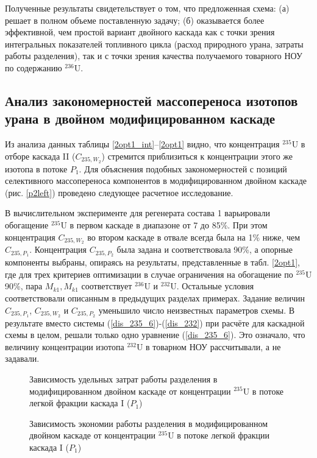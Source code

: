 {Полученные результаты свидетельствует о том, что предложенная схема: (а) решает в полном объеме поставленную задачу; (б) оказывается более эффективной, чем простой вариант двойного каскада как с точки зрения интегральных показателей топливного цикла (расход природного урана, затраты работы разделения), так и с точки зрения качества получаемого товарного НОУ по содержанию $^{236}$U.

\subsection{Анализ закономерностей массопереноса изотопов урана в двойном модифицированном каскаде}


Из анализа данных таблицы \ref{2opt1_int}--\ref{2opt1} видно, что концентрация $^{235}$U в отборе каскада II ($C_{235,{W_2}}$) стремится приблизиться к концентрации этого же изотопа в потоке $P_1$. Для объяснения подобных закономерностей с позиций селективного массопереноса компонентов в модифицированном двойном каскаде (рис. \ref{p2left}) проведено следующее расчетное исследование.

В вычислительном эксперименте для регенерата состава 1 варьировали обогащение $^{235}$U в первом каскаде в диапазоне от 7 до 85\%. При этом концентрация $C_{235,{W_2}}$ во втором каскаде в отвале всегда была на 1\% ниже, чем $C_{235,{P_1}}$. Концентрация  $C_{235,{P_2}}$ была задана и соответствовала 90\%, а опорные компоненты выбраны, опираясь на результаты, представленные в табл. \ref{2opt1}, где для трех критериев оптимизации в случае ограничения на обогащение по $^{235}$U 90\%, пара $M_{k1}, M_{k1}$ соответствует $^{236}$U и $^{232}$U.  Остальные условия соответствовали описанным в предыдущих разделах примерах.  
Задание величин $C_{235,{P_1}}$, $C_{235,{W_2}}$ и $C_{235,{P_2}}$ уменьшило число неизвестных параметров схемы. В результате вместо системы (\ref{dis_235_6})-(\ref{dis_232}) при расчёте для каскадной схемы в целом, решали только одно уравнение (\ref{dis_235_6}). Это означало, что величину концентрации изотопа $^{232}$U в товарном НОУ рассчитывали, а не задавали.    


\begin{figure}[ht]
    \centering
    \begin{minipage}{.5\textwidth}
        \centering
        
  \caption{{Зависимость удельных затрат работы разделения в модифицированном двойном каскаде  от концентрации $^{235}$U в потоке легкой фракции каскада I ($P_1$){\label{SWP1}}}}
  \end{minipage}%
    \begin{minipage}{.5\textwidth}
      \centering
      
\caption{{Зависимость экономии работы разделения в модифицированном двойном каскаде от концентрации $^{235}$U в потоке легкой фракции каскада I ($P_1$){\label{SW_lP1}}}}
    \end{minipage}
\end{figure}

}
